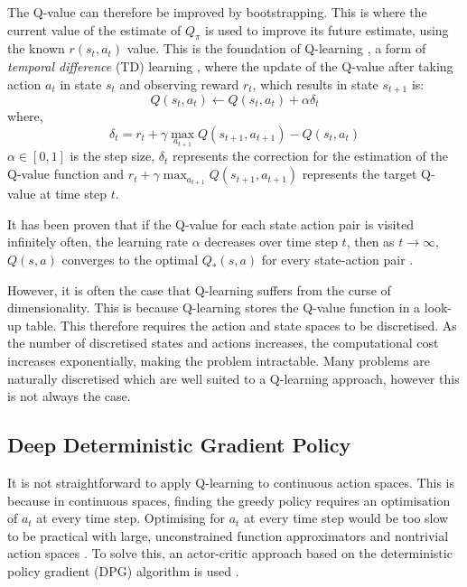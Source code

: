 The Q-value can therefore be improved by bootstrapping. This is where the current value of the estimate of $Q_\pi$ is used to improve its future estimate, using the known $r(s_t,a_t)$ value. This is the foundation of Q-learning \cite{Gay2007}, a form of \textit{temporal difference} (TD) learning \cite{Sutton2015}, where the update of the Q-value after taking action $a_t$ in state $s_t$ and observing reward $r_t$, which results in state $s_{t+1}$ is:
\begin{equation}
Q(s_t,a_t)\leftarrow Q(s_t,a_t)+\alpha\delta_t
\end{equation}
\noindent where,
\begin{equation}
\delta_t=r_t+\gamma\max_{a_{t+1}}Q(s_{t+1},a_{t+1})-Q(s_{t},a_t)
\end{equation}
\noindent $\alpha\in [0,1]$ is the step size, $\delta_t$ represents the correction for the estimation of the Q-value function and $r_t+\gamma\max_{a_{t+1}}Q(s_{t+1},a_{t+1})$ represents the target Q-value at time step $t$.	


It has been proven that if the Q-value for each state action pair is visited infinitely often, the learning rate $\alpha$ decreases over time step $t$, then as $t\rightarrow \infty$, $Q(s,a)$ converges to the optimal $Q_*(s,a)$ for every state-action pair \cite{Gay2007}.

However, it is often the case that Q-learning suffers from the curse of dimensionality. This is because Q-learning stores the Q-value function in a look-up table. This therefore requires the action and state spaces to be discretised. As the number of discretised states and actions increases, the computational cost increases exponentially, making the problem intractable. Many problems are naturally discretised which are well suited to a Q-learning approach, however this is not always the case. 

\subsection{Deep Deterministic Gradient Policy}


It is not straightforward to apply Q-learning to continuous action spaces. This is because in continuous spaces, finding the greedy policy requires an optimisation of $a_t$ at every time step. Optimising for $a_t$ at every time step would be too slow to be practical with large, unconstrained function approximators and nontrivial action spaces \cite{hunt2016a}. To solve this, an actor-critic approach based on the deterministic policy gradient (DPG) algorithm is used \cite{Silver2014}.


